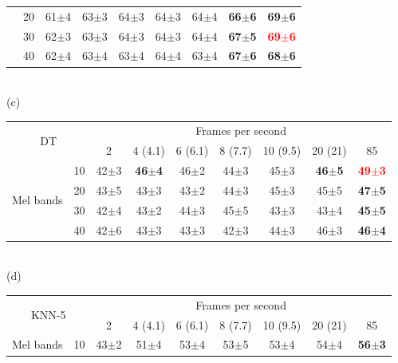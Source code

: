 \documentclass[sensors,article,submit,moreauthors,pdftex,10pt,a4paper]{mdpi}
\begin{document}
\begin{table}[h]
\begin{tabular}{ll|c|c|c|c|c|c|c|}
\multicolumn{1}{|c}{}
 & \multicolumn{1}{|c|}{20} & 61$\pm$4 & 63$\pm$3 & 64$\pm$3 & 64$\pm$3 & 64$\pm$4 & \textbf{66$\pm$6} & \textbf{69$\pm$6} \\ \cline{2-9}
\multicolumn{1}{|c}{}
 & \multicolumn{1}{|c|}{30} & 62$\pm$3 & 63$\pm$3 & 64$\pm$3 & 64$\pm$3 & 64$\pm$4 & \textbf{67$\pm$5} & \textbf{\textcolor{red}{69$\pm$6}} \\ \cline{2-9}
\multicolumn{1}{|c}{}
 & \multicolumn{1}{|c|}{40} & 62$\pm$4 & 63$\pm$4 & 63$\pm$4 & 64$\pm$4 & 63$\pm$4 & \textbf{67$\pm$6} & \textbf{68$\pm$6} \\ \cline{1-9}
\end{tabular}
\\(c)\\
\begin{tabular}{ll|c|c|c|c|c|c|c|}
\cline{3-9}
\multicolumn{2}{c}{\multirow{2}{*}{DT}} & \multicolumn{7}{|c|}{Frames per second}\\ \cline{3-9}
 & & 2 & 4 (4.1) & 6 (6.1) & 8 (7.7) & 10 (9.5) & 20 (21) & 85 \\ \cline{1-9}
\multicolumn{1}{|c}{\multirow{4}{*}{Mel bands}}
 & \multicolumn{1}{|c|}{10} & 42$\pm$3 & \textbf{46$\pm$4} & 46$\pm$2 & 44$\pm$3 & 45$\pm$3 & \textbf{46$\pm$5} & \textbf{\textcolor{red}{49$\pm$3}} \\ \cline{2-9}
\multicolumn{1}{|c}{}
 & \multicolumn{1}{|c|}{20} & 43$\pm$5 & 43$\pm$3 & 43$\pm$2 & 44$\pm$3 & 45$\pm$3 & 45$\pm$5 & \textbf{47$\pm$5} \\ \cline{2-9}
\multicolumn{1}{|c}{}
 & \multicolumn{1}{|c|}{30} & 42$\pm$4 & 43$\pm$2 & 44$\pm$3 & 45$\pm$5 & 43$\pm$3 & 43$\pm$4 & \textbf{45$\pm$5} \\ \cline{2-9}
\multicolumn{1}{|c}{}
 & \multicolumn{1}{|c|}{40} & 42$\pm$6 & 43$\pm$3 & 43$\pm$3 & 42$\pm$3 & 44$\pm$3 & 46$\pm$3 & \textbf{46$\pm$4} \\ \cline{1-9}
\end{tabular}
\\(d)\\
\begin{tabular}{ll|c|c|c|c|c|c|c|}
\cline{3-9}
\multicolumn{2}{c}{\multirow{2}{*}{KNN-5}} & \multicolumn{7}{|c|}{Frames per second}\\ \cline{3-9}
 & & 2 & 4 (4.1) & 6 (6.1) & 8 (7.7) & 10 (9.5) & 20 (21) & 85 \\ \cline{1-9}
\multicolumn{1}{|c}{\multirow{4}{*}{Mel bands}}
 & \multicolumn{1}{|c|}{10} &43$\pm$2 & 51$\pm$4 & 53$\pm$4 & 53$\pm$5 & 53$\pm$4 & 54$\pm$4 & \textbf{56$\pm$3} \\ \cline{2-9}

\end{tabular}
\end{table}
\end{document}
